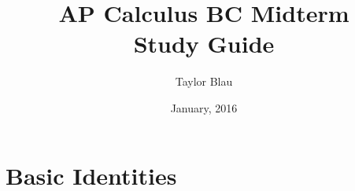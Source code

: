 \documentclass[12pt,letterpaper,titlepage]{book}
\title{AP Calculus BC Midterm\\Study Guide}
\author{Taylor Blau}
\date{January, 2016}
\begin{document}
\maketitle
\tableofcontents

\chapter{Basic Identities}










\end{document}
